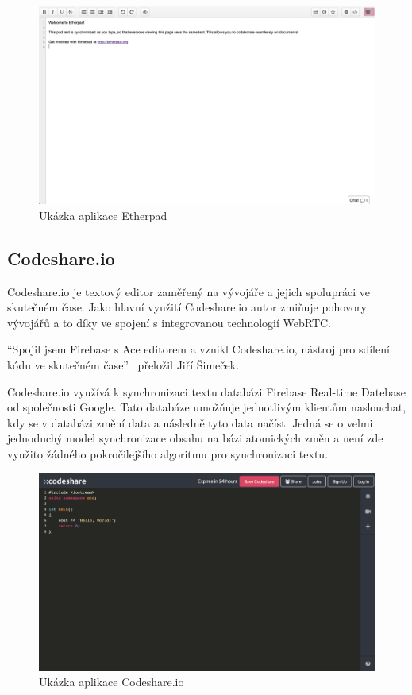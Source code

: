 \begin{figure}[ht]
    \centering
    \includegraphics[width=\textwidth]{partials/analyza/etherpad}
    \caption{Ukázka aplikace Etherpad}\label{fig:etherpad}
\end{figure}

\subsection{Codeshare.io}\label{subsec:codeshare.io}

Codeshare.io je textový editor zaměřený na vývojáře a jejich spolupráci ve skutečném čase.
Jako hlavní využití Codeshare.io autor zmiňuje pohovory vývojářů a to díky ve spojení s integrovanou technologií WebRTC.~\cite{codeshare:home}

\enquote{Spojil jsem Firebase s Ace editorem a vznikl Codeshare.io, nástroj pro sdílení kódu ve skutečném čase}~\cite{codeshare:created} přeložil Jiří Šimeček.

Codeshare.io využívá k synchronizaci textu databázi Firebase Real-time Datebase od společnosti Google.
Tato databáze umožňuje jednotlivým klientům naslouchat, kdy se v databázi změní data a následně tyto data načíst.
Jedná se o velmi jednoduchý model synchronizace obsahu na bázi atomických změn a není zde využito žádného pokročilejšího algoritmu pro synchronizaci textu.~\cite{codeshare:created}

\begin{figure}[ht]
    \centering
    \includegraphics[width=\textwidth]{partials/analyza/codeshare}
    \caption{Ukázka aplikace Codeshare.io}\label{fig:codeshare}
\end{figure}

